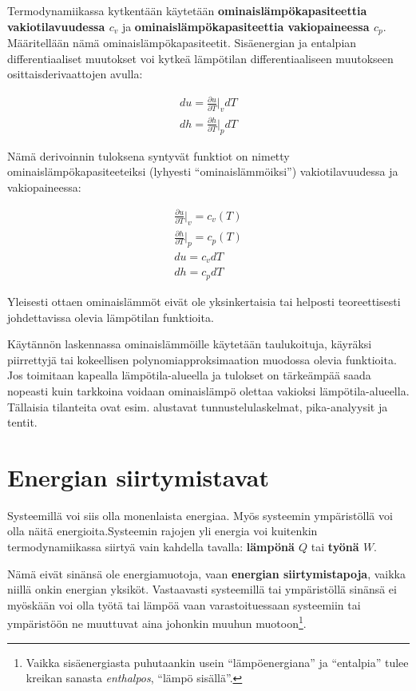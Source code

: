 \documentclass[12pt,a4paper,finnish]{book}
\begin{document}
Termodynamiikassa kytkentään käytetään \textbf{ominaislämpökapasiteettia vakiotilavuudessa $c_v$} ja 
\textbf{ominaislämpökapasiteettia  vakiopaineessa $c_p$}. Määritellään nämä ominaislämpökapasiteetit. Sisäenergian ja 
entalpian differentiaaliset muutokset voi kytkeä lämpötilan differentiaaliseen muutokseen osittaisderivaattojen avulla:

\begin{align}
 du = \frac{\partial u}{\partial T}\bigg|_vdT\\
 dh = \frac{\partial h}{\partial T}\bigg|_pdT
\end{align}

Nämä derivoinnin tuloksena syntyvät funktiot on nimetty ominaislämpökapasiteeteiksi (lyhyesti ``ominaislämmöiksi'') 
vakiotilavuudessa ja vakiopaineessa:

\begin{align}
 \frac{\partial u}{\partial T}\bigg|_v = c_v(T)\\
 \frac{\partial h}{\partial T}\bigg|_p = c_p(T)\\
 du = c_vdT\\
 dh = c_pdT
\end{align}

Yleisesti ottaen ominaislämmöt eivät ole yksinkertaisia tai helposti teoreettisesti johdettavissa olevia lämpötilan 
funktioita. 

Käytännön laskennassa ominaislämmöille käytetään taulukoituja, käyräksi piirrettyjä tai kokeellisen 
polynomiapproksimaation muodossa olevia funktioita. Jos toimitaan kapealla lämpötila-alueella ja tulokset on 
tärkeämpää saada nopeasti kuin tarkkoina voidaan ominaislämpö olettaa vakioksi lämpötila-alueella. Tällaisia tilanteita 
ovat esim. alustavat tunnustelulaskelmat, pika-analyysit ja tentit.


\chapter{Energian siirtymistavat} %

Systeemillä voi siis olla monenlaista energiaa. Myös systeemin ympäristöllä voi olla näitä 
energioita.Systeemin rajojen yli energia voi kuitenkin termodynamiikassa siirtyä vain kahdella tavalla: \textbf{lämpönä $Q$} 
tai \textbf{työnä $W$}. 

Nämä eivät sinänsä ole energiamuotoja, vaan \textbf{energian siirtymistapoja}, vaikka niillä onkin energian
yksiköt. Vastaavasti systeemillä tai ympäristöllä sinänsä ei myöskään voi olla työtä tai lämpöä vaan 
varastoituessaan systeemiin tai ympäristöön ne muuttuvat aina johonkin muuhun muotoon\footnote{Vaikka 
sisäenergiasta puhutaankin usein ``lämpöenergiana'' ja ``entalpia'' tulee kreikan sanasta \textit{enthalpos}, 
``lämpö sisällä''.}.
\end{document}
